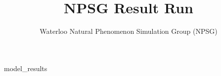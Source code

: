 \documentclass{article}
\begin{document}
\title{NPSG Result Run}
\author{Waterloo Natural Phenomenon Simulation Group (NPSG)}

\maketitle

{{model_results}}
\end{document}
